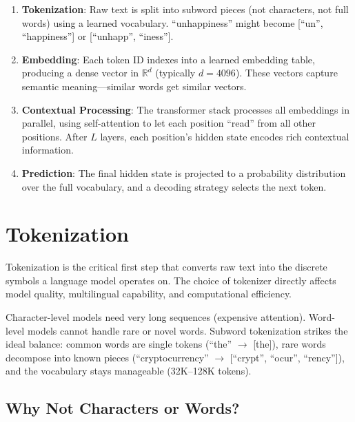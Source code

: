 \begin{keybox}
\begin{enumerate}
  \item \textbf{Tokenization}: Raw text is split into subword pieces (not characters, not full words) using a learned vocabulary. ``unhappiness'' might become [``un'', ``happiness''] or [``unhapp'', ``iness''].
  \item \textbf{Embedding}: Each token ID indexes into a learned embedding table, producing a dense vector in $\mathbb{R}^d$ (typically $d = 4096$). These vectors capture semantic meaning---similar words get similar vectors.
  \item \textbf{Contextual Processing}: The transformer stack processes all embeddings in parallel, using self-attention to let each position ``read'' from all other positions. After $L$ layers, each position’s hidden state encodes rich contextual information.
  \item \textbf{Prediction}: The final hidden state is projected to a probability distribution over the full vocabulary, and a decoding strategy selects the next token.
\end{enumerate}
\end{keybox}

\section{Tokenization}
\label{sec:tokenization}

Tokenization is the critical first step that converts raw text into the discrete symbols a language model operates on. The choice of tokenizer directly affects model quality, multilingual capability, and computational efficiency.

\begin{intuitionbox}
Character-level models need very long sequences (expensive attention). Word-level models cannot handle rare or novel words. Subword tokenization strikes the ideal balance: common words are single tokens (``the'' $\to$ [the]), rare words decompose into known pieces (``cryptocurrency'' $\to$ [``crypt'', ``ocur'', ``rency'']), and the vocabulary stays manageable (32K--128K tokens).
\end{intuitionbox}

\subsection{Why Not Characters or Words?}
\label{why-not-characters-or-words}

